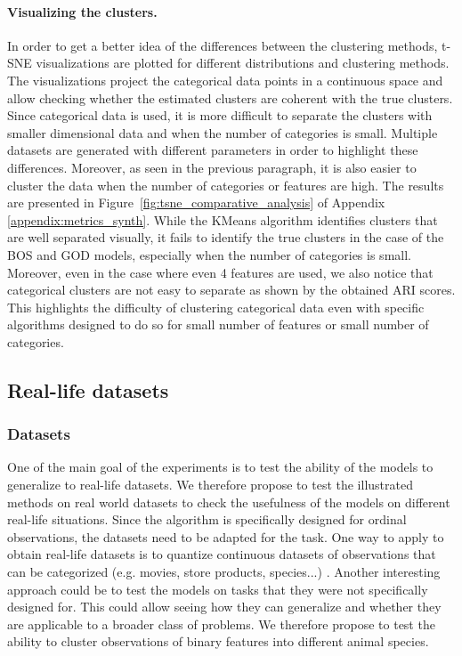 \paragraph{Visualizing the clusters.}
In order to get a better idea of the differences between the clustering methods, t-SNE visualizations \citep{van2008visualizing} are plotted for different distributions and clustering methods. The visualizations project the categorical data points in a continuous space and allow checking whether the estimated clusters are coherent with the true clusters. Since categorical data is used, it is more difficult to separate the clusters with smaller dimensional data and when the number of categories is small. Multiple datasets are generated with different parameters in order to highlight these differences. Moreover, as seen in the previous paragraph, it is also easier to cluster the data when the number of categories or features are high.
The results are presented in Figure~\ref{fig:tsne_comparative_analysis} of Appendix \ref{appendix:metrics_synth}. While the KMeans algorithm identifies clusters that are well separated visually, 
it fails to identify the true clusters in the case of the BOS and GOD models, especially when the number of categories is small. Moreover, even in the case where even 4 features are used, we also notice that categorical clusters are not easy to separate as shown by the obtained ARI scores. This highlights the difficulty of clustering categorical data even with specific algorithms designed to do so for small number of features or small number of categories.

\subsection{Real-life datasets}
\subsubsection{Datasets} One of the main goal of the experiments is to test the ability of the models to generalize to real-life datasets. We therefore propose to test the illustrated methods on real world datasets to check the usefulness of the models on different real-life situations. Since the algorithm is specifically designed for ordinal observations, the datasets need to be adapted for the task. One way to apply to obtain real-life datasets is to quantize continuous datasets of observations that can be categorized (e.g. movies, store products, species...) \citep{skubacz2000quantization}. Another interesting approach could be to test the models on tasks that they were not specifically designed for. This could allow seeing how they can generalize and whether they are applicable to a broader class of problems. We therefore propose to test the ability to cluster observations of binary features into different animal species.
